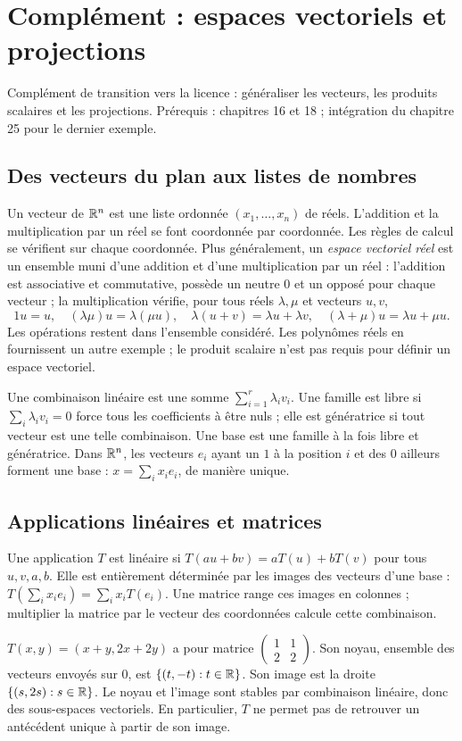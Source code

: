 \documentclass[../cours_1re.tex]{subfiles}
\begin{document}
\setcounter{chapter}{26}
\chapter{Complément : espaces vectoriels et projections}
\label{ch:27}
\begin{objectif}
Complément de transition vers la licence : généraliser les vecteurs, les produits scalaires et les projections.
Prérequis : chapitres 16 et 18 ; intégration du chapitre 25 pour le dernier exemple.
\end{objectif}
\section{Des vecteurs du plan aux listes de nombres}
Un vecteur de $\mathbb{R}^n$ est une liste ordonnée $(x_1,\ldots,x_n)$ de réels.
L'addition et la multiplication par un réel se font coordonnée par coordonnée.
Les règles de calcul se vérifient sur chaque coordonnée.
Plus généralement, un \emph{espace vectoriel réel} est un ensemble muni d'une
addition et d'une multiplication par un réel : l'addition est associative
et commutative, possède un neutre $0$ et un opposé pour chaque vecteur ;
la multiplication vérifie, pour tous réels $\lambda,\mu$ et vecteurs $u,v$,
\[
1u=u,\quad(\lambda\mu)u=\lambda(\mu u),\quad
\lambda(u+v)=\lambda u+\lambda v,\quad
(\lambda+\mu)u=\lambda u+\mu u.
\]
Les opérations restent dans l'ensemble considéré. Les polynômes réels
en fournissent un autre exemple ; le produit scalaire n'est pas requis
pour définir un espace vectoriel.

Une combinaison linéaire est une somme $\sum_{i=1}^r\lambda_i v_i$.
Une famille est libre si $\sum_i\lambda_iv_i=0$ force tous les coefficients
à être nuls ; elle est génératrice si tout vecteur est une telle combinaison.
Une base est une famille à la fois libre et génératrice.
Dans $\mathbb{R}^n$, les vecteurs $e_i$ ayant un $1$ à la position $i$ et des $0$
ailleurs forment une base : $x=\sum_ix_ie_i$, de manière unique.

\section{Applications linéaires et matrices}
Une application $T$ est linéaire si
$T(au+bv)=aT(u)+bT(v)$ pour tous $u,v,a,b$.
Elle est entièrement déterminée par les images des vecteurs d'une base :
$T(\sum_ix_ie_i)=\sum_ix_iT(e_i)$.
Une matrice range ces images en colonnes ; multiplier la matrice par
le vecteur des coordonnées calcule cette combinaison.
\begin{exemple}
$T(x,y)=(x+y,2x+2y)$ a pour matrice
$\begin{pmatrix}1&1\\2&2\end{pmatrix}$.
Son noyau, ensemble des vecteurs envoyés sur $0$, est
$\{(t,-t):t\in\mathbb{R}\}$.
Son image est la droite $\{(s,2s):s\in\mathbb{R}\}$.
Le noyau et l'image sont stables par combinaison linéaire, donc des
sous-espaces vectoriels. En particulier, $T$ ne permet pas de retrouver
un antécédent unique à partir de son image.
\end{exemple}
\end{document}
